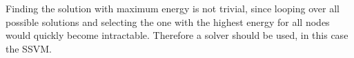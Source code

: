 Finding the solution with maximum energy is not trivial, since 
looping over all possible solutions and selecting the one with the highest energy
for all nodes would quickly become intractable. Therefore a solver should be
used, in this case the SSVM.


